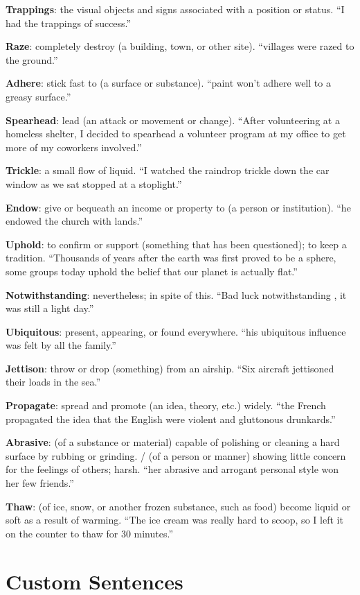 \documentclass[12pt, a4paper]{ximera}
\begin{document}
\textbf{Trappings}: the visual objects and signs associated with a position or status. ``I had the trappings of success.''

\textbf{Raze}: completely destroy (a building, town, or other site). ``villages were razed to the ground.''

\textbf{Adhere}: stick fast to (a surface or substance). ``paint won't adhere well to a greasy surface.''

\textbf{Spearhead}: lead (an attack or movement or change). ``After volunteering at a homeless shelter, I decided to spearhead a volunteer program at my office to get more of my coworkers involved.''

\textbf{Trickle}: a small flow of liquid. ``I watched the raindrop trickle down the car window as we sat stopped at a stoplight.''

\textbf{Endow}: give or bequeath an income or property to (a person or institution). ``he endowed the church with lands.''

\textbf{Uphold}: to confirm or support (something that has been questioned); to keep a tradition. ``Thousands of years after the earth was first proved to be a sphere, some groups today uphold the belief that our planet is actually flat.''

\textbf{Notwithstanding}: nevertheless; in spite of this. ``Bad luck notwithstanding , it was still a light day.''

\textbf{Ubiquitous}: present, appearing, or found everywhere. ``his ubiquitous influence was felt by all the family.''

\textbf{Jettison}: throw or drop (something) from an airship. ``Six aircraft jettisoned their loads in the sea.''

\textbf{Propagate}: spread and promote (an idea, theory, etc.) widely. ``the French propagated the idea that the English were violent and gluttonous drunkards.''

\textbf{Abrasive}: (of a substance or material) capable of polishing or cleaning a hard surface by rubbing or grinding. / (of a person or manner) showing little concern for the feelings of others; harsh. ``her abrasive and arrogant personal style won her few friends.''

\textbf{Thaw}: (of ice, snow, or another frozen substance, such as food) become liquid or soft as a result of warming. ``The ice cream was really hard to scoop, so I left it on the counter to thaw for 30 minutes.''

\newpage
\section{Custom Sentences}
\end{document}

